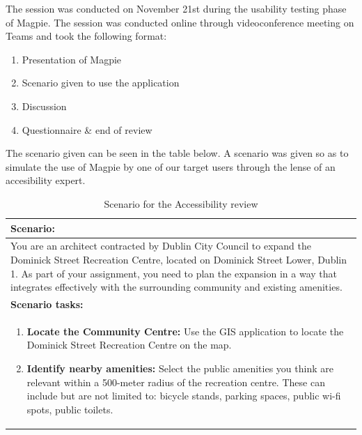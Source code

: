 The session was conducted on November 21st during the usability testing phase of Magpie. The session was conducted online through videoconference meeting on Teams and took the following format:
\begin{enumerate}
    \item Presentation of Magpie
    \item Scenario given to use the application
    \item Discussion
    \item Questionnaire \& end of review
\end{enumerate}
The scenario given can be seen in the table below. A scenario was given so as to simulate the use of Magpie by one of our target users through the lense of an accesibility expert.
\begin{table}[h!]
    \centering
    \caption{Scenario for the Accessibility review}
    \begin{tabular}{|p{\textwidth}|}
        \hline
        \textbf{Scenario:}                                                                                                                                                                                                                                                                                         \\
        \hline
        You are an architect contracted by Dublin City Council to expand the Dominick Street Recreation Centre, located on Dominick Street Lower, Dublin 1. As part of your assignment, you need to plan the expansion in a way that integrates effectively with the surrounding community and existing amenities. \\
        \hline
        \textbf{Scenario tasks:}                                                                                                                                                                                                                                                                                   \\
        \hline
        \begin{enumerate}
            \item \textbf{Locate the Community Centre:} Use the GIS application to locate the Dominick Street Recreation Centre on the map.
            \item \textbf{Identify nearby amenities:} Select the public amenities you think are relevant within a 500-meter radius of the recreation centre. These can include but are not limited to: bicycle stands, parking spaces, public wi-fi spots, public toilets.

\end{enumerate}
\end{tabular}
\end{table}
